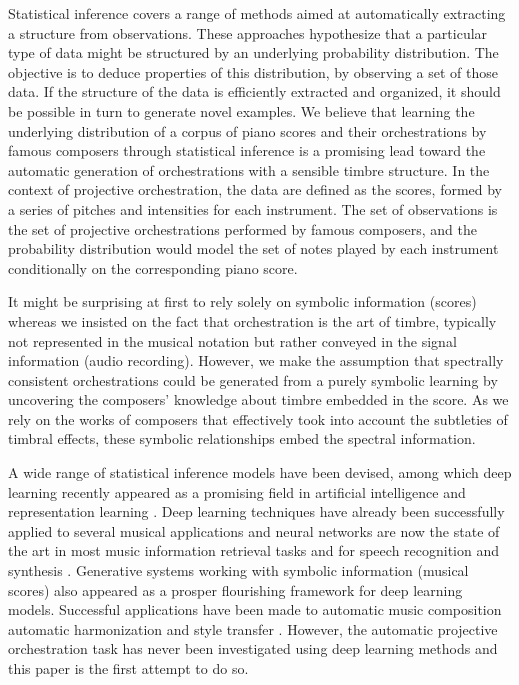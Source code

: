\documentclass{article}
\begin{document}
Statistical inference covers a range of methods aimed at automatically extracting a structure from observations. These approaches hypothesize that a particular type of data might be structured by an underlying probability distribution. The objective is to deduce properties of this distribution, by observing a set of those data. 
If the structure of the data is efficiently extracted and organized, it should be possible in turn to generate novel examples.
We believe that learning the underlying distribution of a corpus of piano scores and their orchestrations by famous composers through statistical inference is a promising lead toward the automatic generation of orchestrations with a sensible timbre structure.
In the context of projective orchestration, the data are defined as the scores, formed by a series of pitches and intensities for each instrument. The set of observations is the set of projective orchestrations performed by famous composers, and the probability distribution would model the set of notes played by each instrument conditionally on the corresponding piano score.

It might be surprising at first to rely solely on symbolic information (scores) whereas we insisted on the fact that orchestration is the art of timbre, typically not represented in the musical notation but rather conveyed in the signal information (audio recording).
However, we make the assumption that spectrally consistent orchestrations could be generated from a purely symbolic learning by uncovering the composers' knowledge about timbre embedded in the score. As we rely on the works of composers that effectively took into account the subtleties of timbral effects, these symbolic relationships embed the spectral information.

A wide range of statistical inference models have been devised, among which deep learning recently appeared as a  promising field in artificial intelligence and representation learning \cite{bengio2013representation,LeCun:2015aa}.
Deep learning techniques have already been successfully applied to several musical applications and neural networks are now the state of the art in most music information retrieval tasks \cite{humphrey2012moving,lee2011unsupervised,boulanger2013audio} and for speech recognition and synthesis \cite{hinton2012deep,DBLP:journals/corr/OordDZSVGKSK16}. Generative systems working with symbolic information (musical scores) also appeared as a prosper flourishing framework for deep learning models. Successful applications have been made to automatic music composition \cite{eck2002finding,lavrenko2003polyphonic,bosley2010learning,boulanger2012modeling,Johnson2015}
automatic harmonization \cite{Sun} and style transfer \cite{pachet2016joyful}. However, the automatic projective orchestration task has never been investigated using deep learning methods and this paper is the first attempt to do so.
\end{document}
